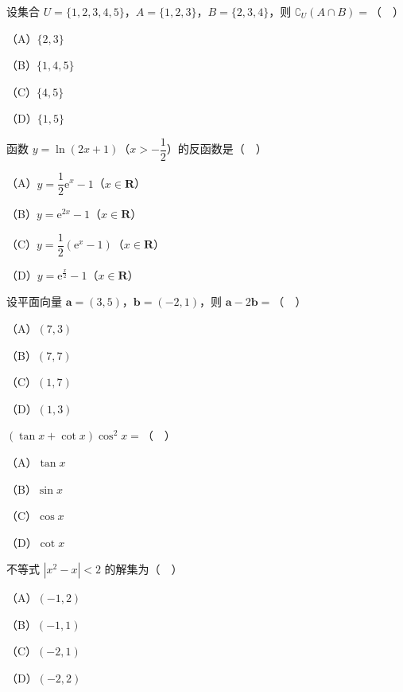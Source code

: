 


\begin{question}
设集合 $U=\{1,2,3,4,5\}$，$A=\{1,2,3\}$，$B=\{2,3,4\}$，则 $\complement_U(A\cap B)=$（　）

（A）$\{2,3\}$

（B）$\{1,4,5\}$

（C）$\{4,5\}$

（D）$\{1,5\}$

\end{question}
\begin{question}
函数 $y=\ln(2x+1)$（$x>-\dfrac12$）的反函数是（　）

（A）$y=\dfrac12\mathrm e^x-1$（$x\in\mathbf R$）

（B）$y=\mathrm e^{2x}-1$（$x\in\mathbf R$）

（C）$y=\dfrac12(\mathrm e^x-1)$（$x\in\mathbf R$）

（D）$y=\mathrm e^{\frac x2}-1$（$x\in\mathbf R$）

\end{question}
\begin{question}
设平面向量 $\boldsymbol a=(3,5)$，$\boldsymbol b=(-2,1)$，则 $\boldsymbol a-2\boldsymbol b=$（　）

（A）$(7,3)$

（B）$(7,7)$

（C）$(1,7)$

（D）$(1,3)$

\end{question}
\begin{question}
$(\tan x+\cot x)\cos^2x=$（　）

（A）$\tan x$

（B）$\sin x$

（C）$\cos x$

（D）$\cot x$

\end{question}
\begin{question}
不等式 $|x^2-x|<2$ 的解集为（　）

（A）$(-1,2)$

（B）$(-1,1)$

（C）$(-2,1)$

（D）$(-2,2)$

\end{question}
